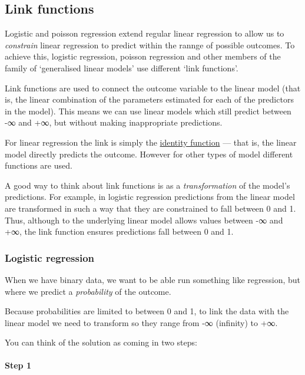 \documentclass[]{article}
\let\oldparagraph\paragraph
\renewcommand{\paragraph}[1]{\oldparagraph{#1}\mbox{}}
\begin{document}
\hypertarget{link-functions}{%
\subsection{Link functions}\label{link-functions}}

Logistic and poisson regression extend regular linear regression to allow us to
\emph{constrain} linear regression to predict within the rannge of possible outcomes.
To achieve this, logistic regression, poisson regression and other members of
the family of `generalised linear models' use different `link functions'.

Link functions are used to connect the outcome variable to the linear model
(that is, the linear combination of the parameters estimated for each of the
predictors in the model). This means we can use linear models which still
predict between -∞ and +∞, but without making inappropriate predictions.

For linear regression the link is simply the
\href{https://en.wikipedia.org/wiki/Identity_function}{identity function} --- that is,
the linear model directly predicts the outcome. However for other types of model
different functions are used.

A good way to think about link functions is as a \emph{transformation} of the model's
predictions. For example, in logistic regression predictions from the linear
model are transformed in such a way that they are constrained to fall between 0
and 1. Thus, although to the underlying linear model allows values between -∞
and +∞, the link function ensures predictions fall between 0 and 1.

\hypertarget{logistic-link-function}{%
\subsubsection*{Logistic regression}\label{logistic-link-function}}

When we have binary data, we want to be able run something like regression, but
where we predict a \emph{probability} of the outcome.

Because probabilities are limited to between 0 and 1, to link the data with the
linear model we need to transform so they range from -∞ (infinity) to +∞.

You can think of the solution as coming in two steps:

\hypertarget{step-1}{%
\paragraph{Step 1}\label{step-1}}
\end{document}
